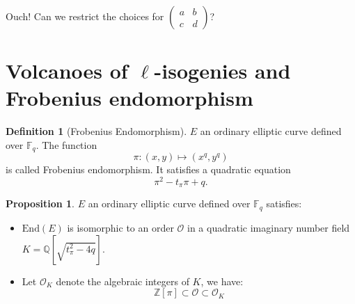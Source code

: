 \documentclass[10pt,a4paper]{beamer}
\theoremstyle{plain}
\theoremstyle{definition}
\theoremstyle{definition}
\theoremstyle{definition}
\newtheorem{prop}[thm]{Proposition}
\theoremstyle{definition}
\newtheorem{defi}[thm]{Definition}
\theoremstyle{remark}
\theoremstyle{remark}
\begin{document}
\begin{frame}
\pause
\begin{center}
    Ouch! Can we restrict the choices for $\left(\begin{smallmatrix}a&b\\c&d\end{smallmatrix}\right)$?
\end{center}

\end{frame}


\section{Volcanoes of $\ell$-isogenies and Frobenius endomorphism}

\begin{frame}

\begin{defi}[Frobenius Endomorphism]
$E$ an ordinary elliptic curve defined over $\mathbb{F}_q$. The function \[ \pi:(x,y) \mapsto (x^q,y^q)\] is called Frobenius endomorphism. It satisfies a quadratic equation \[ \pi^2 - t_\pi \pi + q.\]
\end{defi}

\begin{prop} \label{prop:p-tor}
$E$ an ordinary elliptic curve defined over $\mathbb{F}_q$ satisfies:
\begin{itemize}
\item  $\mathrm{End}(E)$ is isomorphic to an order $\mathcal{O}$ in a quadratic imaginary number field $K=\mathbb{Q}[\sqrt{t_{\pi}^2-4q}]$.


\item Let $\mathcal{O}_K$ denote the algebraic integers of $K$, we have:
\[ \mathbb{Z}[\pi] \subset \mathcal{O} \subset \mathcal{O}_K \]
\end{itemize}
\end{prop}


\end{frame}

\end{document}
